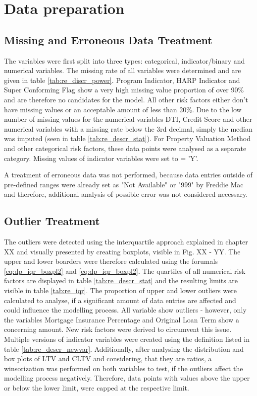 \section{Data preparation}
\subsection{Missing and Erroneous Data Treatment}
The variables were first split into three types: categorical, indicator/binary and numerical variables. The missing rate of all variables were determined and are given in table \ref{tab:re_discr_power}. Program Indicator, HARP Indicator and Super Conforming Flag show a very high missing value proportion of over 90\% and are therefore no candidates for the model. All other risk factors either don't have missing values or an acceptable amount of less than 20\%. Due to the low number of missing values for the numerical variables DTI, Credit Score and other numerical variables with a missing rate below the 3rd decimal, simply the median was imputed (seen in table \ref{tab:re_descr_stat}). For Property Valuation Method and other categorical risk factors, these data points were analysed as a separate category. Missing values of indicator variables were set to = 'Y'. 

A treatment of erroneous data was not performed, because data entries outside of pre-defined ranges were already set as "Not Available" or "999" by Freddie Mac and therefore, additional analysis of possible error was not considered necessary. 

\subsection{Outlier Treatment}
The outliers were detected using the interquartile approach explained in chapter XX and visually presented by creating boxplots, visible in Fig. XX - YY. The upper and lower boarders were therefore calculated using the forumals \ref{eq:dp_iqr_boxpl2} and \ref{eq:dp_iqr_boxpl2}. The quartiles of all numerical risk factors are displayed in table \ref{tab:re_descr_stat} and the resulting limits are visible in table \ref{tab:re_iqr}. The proportion of upper and lower outliers were calculated to analyse, if a significant amount of data entries are affected and could influence the modelling process. All variable show outliers - however, only the variables Mortgage Insurance Percentage and Original Loan Term show a concerning amount. New risk factors were derived to circumvent this issue. Multiple versions of indicator variables were created using the definition listed in table \ref{tab:re_descr_newvar}. Additionally, after analysing the distribution and box plots of LTV and CLTV and considering, that they are ratios, a winsorization was performed on both variables to test, if the outliers affect the modelling process negatively. Therefore, data points with values above the upper or below the lower limit, were capped at the respective limit. 


